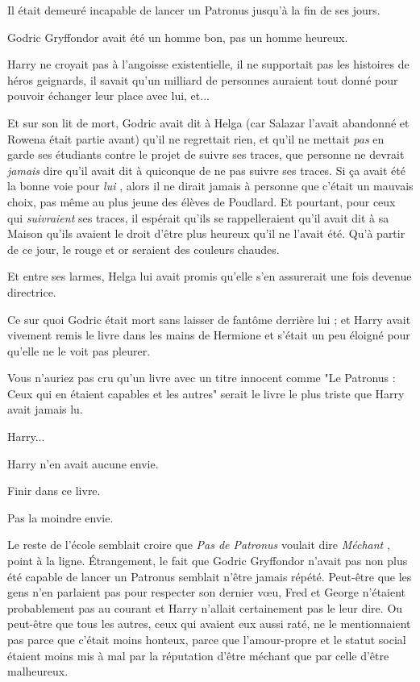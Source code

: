 Il était demeuré incapable de lancer un Patronus jusqu'à la fin de ses jours.

Godric Gryffondor avait été un homme bon, pas un homme heureux.

Harry ne croyait pas à l'angoisse existentielle, il ne supportait pas les histoires de héros geignards, il savait qu'un milliard de personnes auraient tout donné pour pouvoir échanger leur place avec lui, et...

Et sur son lit de mort, Godric avait dit à Helga (car Salazar l'avait abandonné et Rowena était partie avant) qu'il ne regrettait rien, et qu'il ne mettait \emph{pas}  en garde ses étudiants contre le projet de suivre ses traces, que personne ne devrait \emph{jamais}  dire qu'il avait dit à quiconque de ne pas suivre ses traces. Si ça avait été la bonne voie pour \emph{lui} , alors il ne dirait jamais à personne que c'était un mauvais choix, pas même au plus jeune des élèves de Poudlard. Et pourtant, pour ceux qui \emph{suivraient}  ses traces, il espérait qu'ils se rappelleraient qu'il avait dit à sa Maison qu'ils avaient le droit d'être plus heureux qu'il ne l'avait été. Qu'à partir de ce jour, le rouge et or seraient des couleurs chaudes.

Et entre ses larmes, Helga lui avait promis qu'elle s'en assurerait une fois devenue directrice.

Ce sur quoi Godric était mort sans laisser de fantôme derrière lui ; et Harry avait vivement remis le livre dans les mains de Hermione et s'était un peu éloigné pour qu'elle ne le voit pas pleurer.

Vous n'auriez pas cru qu'un livre avec un titre innocent comme "Le Patronus : Ceux qui en étaient capables et les autres" serait le livre le plus triste que Harry avait jamais lu.

Harry...

Harry n'en avait aucune envie.

Finir dans ce livre.

Pas la moindre envie.

Le reste de l'école semblait croire que \emph{Pas de Patronus}  voulait dire \emph{Méchant} , point à la ligne. Étrangement, le fait que Godric Gryffondor n'avait pas non plus été capable de lancer un Patronus semblait n'être jamais répété. Peut-être que les gens n'en parlaient pas pour respecter son dernier vœu, Fred et George n'étaient probablement pas au courant et Harry n'allait certainement pas le leur dire. Ou peut-être que tous les autres, ceux qui avaient eux aussi raté, ne le mentionnaient pas parce que c'était moins honteux, parce que l'amour-propre et le statut social étaient moins mis à mal par la réputation d'être méchant que par celle d'être malheureux.

